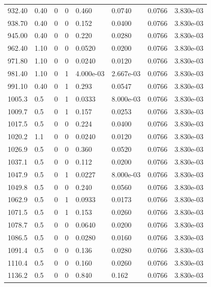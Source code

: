 \documentclass[preview]{standalone}
\begin{document}
{{{{\begin{tabular}{L{1.2cm}C{1.2cm} C{0.3cm}C{0.5cm} C{1.4cm}C{1.4cm} C{1.4cm}C{1.4cm}}
  932.40  &  0.40  & 0     &  0 &  0.460  & 0.0740  & 0.0766 &  3.830e-03   \\ 
  938.70  &  0.40  & 0     &  0 &  0.152  & 0.0400  & 0.0766 &  3.830e-03   \\ 
  945.00  &  0.40  & 0     &  0 &  0.220  & 0.0280  & 0.0766 &  3.830e-03   \\ 
  962.40  &  1.10  & 0     &  0 &  0.0520  & 0.0200  & 0.0766 &  3.830e-03   \\ 
  971.80  &  1.10  & 0     &  0 &  0.0240  & 0.0120  & 0.0766 &  3.830e-03   \\ 
  981.40  &  1.10  & 0     &  1 &  4.000e-03  & 2.667e-03  & 0.0766 &  3.830e-03   \\ 
  991.10  &  0.40  & 0     &  1 &  0.293  & 0.0547  & 0.0766 &  3.830e-03   \\ 
  1005.3  &   0.5  & 0     &  1 &  0.0333  & 8.000e-03  & 0.0766 &  3.830e-03   \\ 
  1009.7  &   0.5  & 0     &  1 &  0.157  & 0.0253  & 0.0766 &  3.830e-03   \\ 
  1017.5  &   0.5  & 0     &  0 &  0.224  & 0.0400  & 0.0766 &  3.830e-03   \\ 
  1020.2  &   1.1  & 0     &  0 &  0.0240  & 0.0120  & 0.0766 &  3.830e-03   \\ 
  1026.9  &   0.5  & 0     &  0 &  0.360  & 0.0520  & 0.0766 &  3.830e-03   \\ 
  1037.1  &   0.5  & 0     &  0 &  0.112  & 0.0200  & 0.0766 &  3.830e-03   \\ 
  1047.9  &   0.5  & 0     &  1 &  0.0227  & 8.000e-03  & 0.0766 &  3.830e-03   \\ 
  1049.8  &   0.5  & 0     &  0 &  0.240  & 0.0560  & 0.0766 &  3.830e-03   \\ 
  1062.9  &   0.5  & 0     &  1 &  0.0933  & 0.0173  & 0.0766 &  3.830e-03   \\ 
  1071.5  &   0.5  & 0     &  1 &  0.153  & 0.0260  & 0.0766 &  3.830e-03   \\ 
  1078.7  &   0.5  & 0     &  0 &  0.0640  & 0.0200  & 0.0766 &  3.830e-03   \\ 
  1086.5  &   0.5  & 0     &  0 &  0.0280  & 0.0160  & 0.0766 &  3.830e-03   \\ 
  1091.4  &   0.5  & 0     &  0 &  0.136  & 0.0280  & 0.0766 &  3.830e-03   \\ 
  1110.4  &   0.5  & 0     &  0 &  0.160  & 0.0260  & 0.0766 &  3.830e-03   \\ 
  1136.2  &   0.5  & 0     &  0 &  0.840  & 0.162  & 0.0766 &  3.830e-03   \\ 

\end{tabular}}}}}
\end{document}
